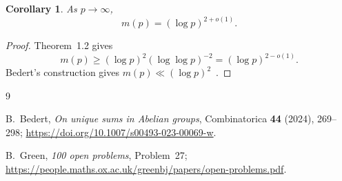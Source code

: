 \documentclass[10pt]{article}
\newtheorem{corollary}[theorem]{Corollary}
\theoremstyle{definition}
\begin{document}
\begin{corollary}
As $p\to\infty$,
\[
    m(p)=(\log p)^{2+o(1)}.
\]
\end{corollary}

\begin{proof}
Theorem~1.2 gives
\[
    m(p)\ge(\log p)^2(\log\log p)^{-2}
          =(\log p)^{2-o(1)}.
\]
Bedert's construction gives $m(p)\ll(\log p)^2$~\cite{bedert}.
\end{proof}

\begin{thebibliography}{9}

B.~Bedert,
\emph{On unique sums in Abelian groups},
Combinatorica \textbf{44} (2024), 269--298;
\url{https://doi.org/10.1007/s00493-023-00069-w}.

B.~Green,
\emph{100 open problems}, Problem~27;
\url{https://people.maths.ox.ac.uk/greenbj/papers/open-problems.pdf}.

\end{thebibliography}
\end{document}
